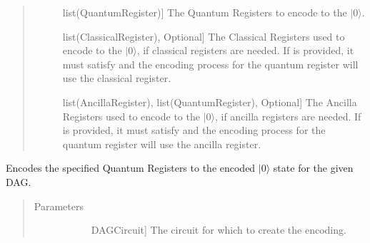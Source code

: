\documentclass[letterpaper,10pt,english]{sphinxmanual}
\begin{document}
\begin{fulllineitems}
\begin{fulllineitems}
\begin{quote}
\begin{description}
\begin{description}
\item[{}] \leavevmode{[}list(QuantumRegister){]}
\sphinxAtStartPar
The Quantum Registers to encode to the \(|0\rangle\).

\item[{}] \leavevmode{[}list(ClassicalRegister), Optional{]}
\sphinxAtStartPar
The Classical Registers used to encode to the \(|0\rangle\), if classical registers are needed. If  is provided, it must satisfy  and the encoding process for the  quantum register will use the  classical register.

\item[{}] \leavevmode{[}list(AncillaRegister), list(QuantumRegister), Optional{]}
\sphinxAtStartPar
The Ancilla Registers used to encode to the \(|0\rangle\), if ancilla registers are needed. If  is provided, it must satisfy  and the encoding process for the  quantum register will use the  ancilla register.

\end{description}

\end{description}\end{quote}

\end{fulllineitems}


\begin{fulllineitems}
\label{\detokenize{Base:BaseFaultTolerance.Encoder.getEncoderDag}}
\sphinxAtStartPar
Encodes the specified Quantum Registers to the encoded \(|0\rangle\) state for the given DAG.
\begin{quote}\begin{description}
\item[{Parameters}] \leavevmode\begin{description}
\item[{}] \leavevmode{[}DAGCircuit{]}
\sphinxAtStartPar
The circuit for which to create the encoding.


\end{description}
\end{description}
\end{quote}
\end{fulllineitems}
\end{fulllineitems}
\end{document}
